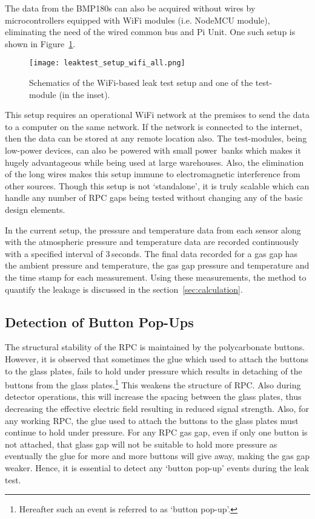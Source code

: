 The data from the BMP180s can also be acquired without wires by
microcontrollers equipped with WiFi modules (i.e. NodeMCU
module\cite{nodemcu2015}), eliminating the need of the wired common bus and
Pi Unit. One such setup is shown in Figure~\ref{fig:leakwifi}. 
\begin{figure}
  \centering
  \texttt{[image: leaktest\_setup\_wifi\_all.png]}
  \caption{Schematics of the WiFi-based leak test setup and one of the
    test-module (in the inset).}
  \label{fig:leakwifi}
\end{figure}
This setup requires an operational WiFi network at the premises to send the
data to a computer on the same network. If the network is connected to the
internet, then the data can be stored at any remote location also. The
test-modules, being low-power devices, can also be powered with small
power~banks which makes it hugely advantageous while being used at large
warehouses. Also, the elimination of the long wires makes this setup immune
to electromagnetic interference from other sources. Though this setup is not
`standalone', it is truly scalable which can handle any number of RPC gaps
being tested without changing any of the basic design elements.

In the current setup, the pressure and temperature data from each sensor along
with the atmospheric pressure and temperature data are recorded continuously
with a specified interval of $3$\,seconds. The final data recorded for a gas
gap has the ambient pressure and temperature, the gas gap pressure and
temperature and the time stamp for each measurement. Using these measurements,
the method to quantify the leakage is discussed in the
section~\ref{sec:calculation}.

\subsection{Detection of Button Pop-Ups}\label{sec:button}
The structural stability of the RPC is maintained by the polycarbonate buttons.
However, it is observed that sometimes the glue which used to attach the
buttons to the glass plates, fails to hold under pressure which results in
detaching of the buttons from the glass plates.\footnote{Hereafter such an event is referred to as `button pop-up'.}
This weakens the structure of RPC. Also during detector operations, this will
increase the spacing between the glass plates, thus decreasing the effective
electric field resulting in reduced signal strength. Also, for any working RPC,
the glue used to attach the buttons to the glass plates must continue to hold
under pressure. For any RPC gas gap, even if only one button is not attached,
that glass gap will not be suitable to hold more pressure as eventually the
glue for more and more buttons will give away, making the gas gap weaker.
Hence, it is essential to detect any `button pop-up' events during the leak
test.

